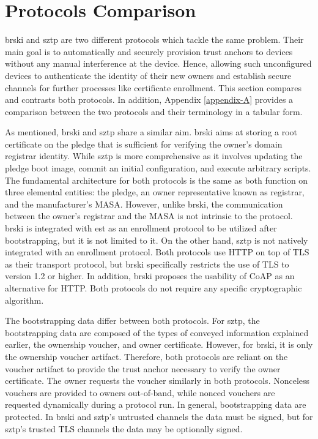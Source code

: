 \section{Protocols Comparison}
\gls{brski} and \gls{sztp} are two different protocols which tackle the same problem. Their main goal is to automatically and securely provision trust anchors to devices without any manual interference at the device. Hence, allowing such unconfigured devices to authenticate the identity of their new owners and establish secure channels for further processes like certificate enrollment.
This section compares and contrasts both protocols. In addition, Appendix \ref{appendix-A} provides a comparison between the two protocols and their terminology in a tabular form.
\par
As mentioned, \gls{brski} and \gls{sztp} share a similar aim. \gls{brski} aims at storing a root certificate on the pledge that is sufficient for verifying the owner's domain registrar identity. While \gls{sztp} is more comprehensive as it involves updating the pledge boot image, commit an initial configuration, and execute arbitrary scripts.
The fundamental architecture for both protocols is the same as both function on three elemental entities: the pledge, an owner representative known as registrar, and the manufacturer's MASA. However, unlike \gls{brski}, the communication between the owner's registrar and the MASA is not intrinsic to the protocol. \gls{brski} is integrated with \gls{est} as an enrollment protocol to be utilized after bootstrapping, but it is not limited to it. On the other hand, \gls{sztp} is not natively integrated with an enrollment protocol. Both protocols use HTTP on top of TLS as their transport protocol, but \gls{brski} specifically restricts the use of TLS to version 1.2 or higher. In addition, \gls{brski} proposes the usability of CoAP as an alternative for HTTP. Both protocols do not require any specific cryptographic algorithm. 
\par
The bootstrapping data differ between both protocols. For \gls{sztp}, the bootstrapping data are composed of the types of conveyed information explained earlier, the ownership voucher, and owner certificate. However, for \gls{brski}, it is only the ownership voucher artifact. Therefore, both protocols are reliant on the voucher artifact to provide the trust anchor necessary to verify the owner certificate. The owner requests the voucher similarly in both protocols. Nonceless vouchers are provided to owners out-of-band, while nonced vouchers are requested dynamically during a protocol run. In general, bootstrapping data are protected. In \gls{brski} and \gls{sztp}'s untrusted channels the data must be signed, but for \gls{sztp}'s trusted TLS channels the data may be optionally signed.

